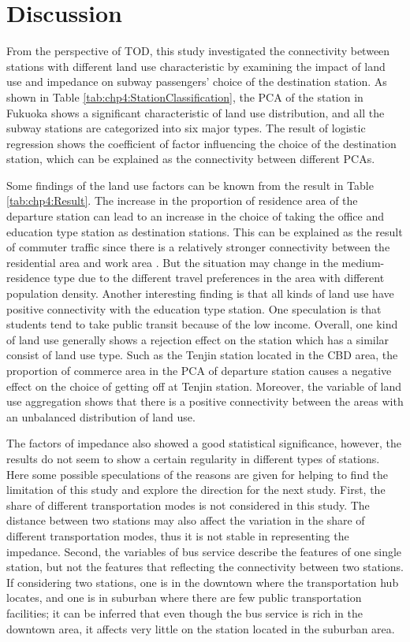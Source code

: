 \section{Discussion}
%
From the perspective of TOD, this study investigated the connectivity between stations with different land use characteristic by examining the impact of land use and impedance on subway passengers' choice of the destination station. As shown in Table \ref{tab:chp4:StationClassification}, the PCA of the station in Fukuoka shows a significant characteristic of land use distribution, and all the subway stations are categorized into six major types. The result of logistic regression shows the coefficient of factor influencing the choice of the destination station, which can be explained as the connectivity between different PCAs.

%
Some findings of the land use factors can be known from the result in Table \ref{tab:chp4:Result}. The increase in the proportion of residence area of the departure station can lead to an increase in the choice of taking the office and education type station as destination stations. This can be explained as the result of commuter traffic since there is a relatively stronger connectivity between the residential area and work area \cite{badoe2000transportation}. But the situation may change in the medium-residence type due to the different travel preferences in the area with different population density. Another interesting finding is that all kinds of land use have positive connectivity with the education type station. One speculation is that students tend to take public transit because of the low income. Overall, one kind of land use generally shows a rejection effect on the station which has a similar consist of land use type. Such as the Tenjin station located in the CBD area, the proportion of commerce area in the PCA of departure station causes a negative effect on the choice of getting off at Tenjin station. Moreover, the variable of land use aggregation shows that there is a positive connectivity between the areas with an unbalanced distribution of land use.

%
The factors of impedance also showed a good statistical significance, however, the results do not seem to show a certain regularity in different types of stations. Here some possible speculations of the reasons are given for helping to find the limitation of this study and explore the direction for the next study. First, the share of different transportation modes is not considered in this study. The distance between two stations may also affect the variation in the share of different transportation modes, thus it is not stable in representing the impedance.  Second, the variables of bus service describe the features of one single station, but not the features that reflecting the connectivity between two stations. If considering two stations, one is in the downtown where the transportation hub locates, and one is in suburban where there are few public transportation facilities; it can be inferred that even though the bus service is rich in the downtown area, it affects very little on the station located in the suburban area.

